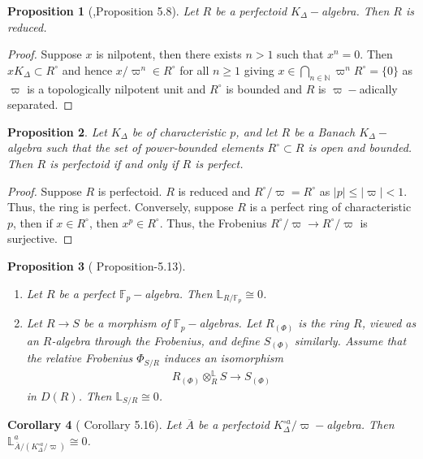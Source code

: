 \documentclass[12pts,a4paper]{amsart}
\newtheorem{proposition}{Proposition}[section]
\newtheorem{corollary}[proposition]{Corollary}
\begin{document}
\begin{proposition}[\cite{Sch},Proposition 5.8]
    Let $R$ be a perfectoid $K_\Delta-$algebra. Then $R$ is reduced.
\end{proposition}

\begin{proof}
     Suppose $x$ is nilpotent, then there exists $n>1$ such that $x^n=0$. Then $xK_\Delta\subset R^\circ$ and hence $x/\varpi^n\in R^\circ$ for all $n\geq 1$ giving $x\in\bigcap\limits_{n\in\mathbb{N}}\varpi^n R^\circ=\{0\}$ as $\varpi$ is a topologically nilpotent unit and $R^\circ$ is bounded and $R$ is $\varpi-$adically separated. 
\end{proof}

\begin{proposition}
    Let $K_\Delta$ be of characteristic $p$, and let $R$ be a Banach $K_\Delta-$algebra such that the set of power-bounded elements $R^\circ\subset R$ is open and bounded. Then $R$ is perfectoid if and only if $R$ is perfect.
\end{proposition}

\begin{proof}
    Suppose $R$ is perfectoid. $R$ is reduced and $R^\circ/\varpi=R^\circ$ as $|p|\leq |\varpi|<1$. Thus, the ring is perfect. Conversely, suppose $R$ is a perfect ring of characteristic $p$, then if $x\in R^\circ$, then $x^p\in R^\circ$. Thus, the Frobenius $R^\circ/\varpi\to R^\circ/\varpi$ is surjective. 
\end{proof}

\begin{proposition}[\cite{Sch} Proposition-5.13]
    \begin{enumerate}
        \item[(i).] Let $R$ be a perfect $\mathbb{F}_p-$algebra. Then $\mathbb{L}_{R/\mathbb{F}_p}\cong 0$.
        \item[(ii).] Let $R\to S$ be a morphism of $\mathbb{F}_p-$algebras. Let $R_{(\Phi)}$ is the ring $R$, viewed as an $R$-algebra through the Frobenius, and define $S_{(\Phi)}$ similarly. Assume that the relative Frobenius $\Phi_{S/R}$ induces an isomorphism
        \begin{align*}
            R_{(\Phi)}\otimes^{\mathbb{L}}_RS\to S_{(\Phi)}
        \end{align*}
        in $D(R)$. Then $\mathbb{L}_{S/R}\cong 0$.
    \end{enumerate}
\end{proposition}

\begin{corollary}[\cite{Sch} Corollary 5.16]\label{Cor6.1}
Let $\overline{A}$ be a perfectoid $K^{\circ a}_\Delta/\varpi-$algebra. Then $\mathbb{L}^a_{\overline{A}/(K^{\circ a}_\Delta/\varpi)}\cong 0$.
\end{corollary}
\end{document}
